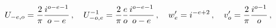 \begin{equation}
U_{-e,o}={\frac{2}{\pi }}{\frac{i^{o-e-1}}{o-e}}\,,\quad U_{-o,e}^{-1}={%
\frac{2}{\pi }}{\frac{e}{o}}{\frac{i^{o-e-1}}{o-e}}\,,\quad w_{e}^{\prime
}=i^{-e+2}\,,\quad v_{o}^{\prime }={\frac{2}{\pi }}{\frac{i^{o-1}}{o}}\,,
\label{eq:UU^-1limit}
\end{equation}

